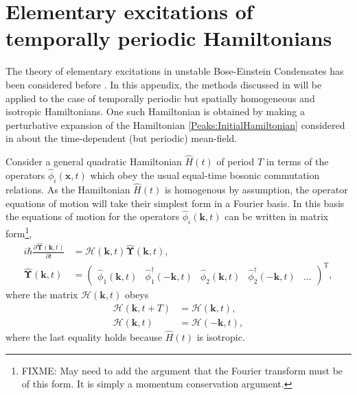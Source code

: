 \chapter{Elementary excitations of temporally periodic Hamiltonians}
\label{PeaksAppendix}
\graphicspath{{Figures/PeaksAppendix/}{Figures/Common/}}

The theory of elementary excitations in unstable Bose-Einstein Condensates has been considered before \citep{Leonhardt:2003}. In this appendix, the methods discussed in \citep{Leonhardt:2003} will be applied to the case of temporally periodic but spatially homogeneous and isotropic Hamiltonians. One such Hamiltonian is obtained by making a perturbative expansion of the Hamiltonian \eqref{Peaks:InitialHamiltonian} considered in  about the time-dependent (but periodic) mean-field.

Consider a general quadratic Hamiltonian $\hat{H}(t)$ of period $T$ in terms of the operators $\hat{\phi}_i(\bm{x}, t)$ which obey the usual equal-time bosonic commutation relations. As the Hamiltonian $\hat{H}(t)$ is homogenous by assumption, the operator equations of motion will take their simplest form in a Fourier basis. In this basis the equations of motion for the operators $\hat{\phi}_i(\bm{k}, t)$ can be written in matrix form\footnote{FIXME: May need to add the argument that the Fourier transform must be of this form. It is simply a momentum conservation argument.},
\begin{subequations}
    \label{PeaksAppendix:MatrixOperatorEvolution}
    \begin{align}
        i \hbar \frac{\partial \hat{\bm{\Upsilon}}(\bm{k}, t)}{\partial t} &= \mathcal{H}(\bm{k}, t) \hat{\bm{\Upsilon}}(\bm{k}, t),\\
        \hat{\bm{\Upsilon}}(\bm{k}, t) &= 
        \begin{pmatrix}
            \hat{\phi}_1(\bm{k}, t) &
            \hat{\phi}_1^\dagger(-\bm{k}, t) &
            \hat{\phi}_2(\bm{k}, t) &
            \hat{\phi}_2^\dagger(-\bm{k}, t) &
            \dots
        \end{pmatrix}^\text{T},
    \end{align}
\end{subequations}
where the matrix $\mathcal{H}(\bm{k}, t)$ obeys
\begin{align}
        \mathcal{H}(\bm{k}, t+T) &= \mathcal{H}(\bm{k}, t),\\
        \mathcal{H}(\bm{k}, t) &= \mathcal{H}(-\bm{k}, t), \label{PeaksAppendix:HReflectionSymmetry}
\end{align}
where the last equality holds because $\hat{H}(t)$ is isotropic.

